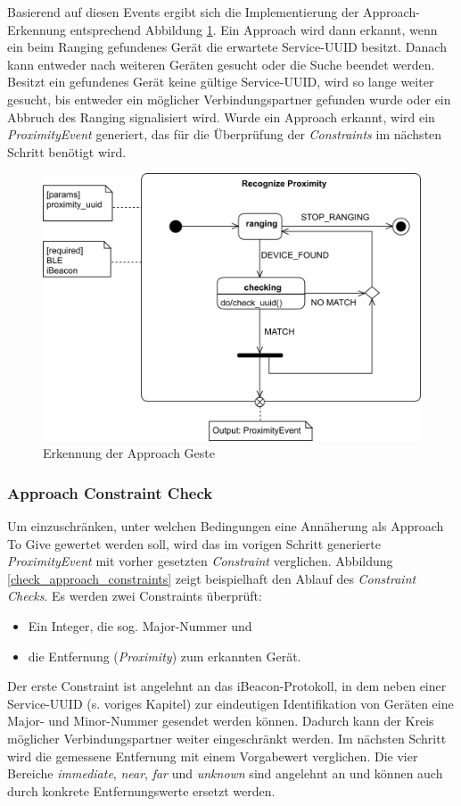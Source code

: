 {Basierend auf diesen Events ergibt sich die Implementierung der Approach-Erkennung entsprechend Abbildung \ref{recognize_approach}. Ein Approach wird dann erkannt, wenn ein beim Ranging gefundenes Gerät die erwartete Service-UUID besitzt. Danach kann entweder nach weiteren Geräten gesucht oder die Suche beendet werden. Besitzt ein gefundenes Gerät keine gültige Service-UUID, wird so lange weiter gesucht, bis entweder ein möglicher Verbindungspartner gefunden wurde oder ein Abbruch des Ranging signalisiert wird. Wurde ein Approach erkannt, wird ein \textit{ProximityEvent} generiert, das für die Überprüfung der \textit{Constraints} im nächsten Schritt benötigt wird.

\begin{figure}[h]
\includegraphics[width=\textwidth]{approach_recognize.png}
\caption{Erkennung der Approach Geste}
\label{recognize_approach}
\end{figure}

\subsubsection*{Approach Constraint Check}
Um einzuschränken, unter welchen Bedingungen eine Annäherung als Approach To Give gewertet werden soll, wird das im vorigen Schritt generierte \textit{ProximityEvent} mit vorher gesetzten \textit{Constraint} verglichen. Abbildung \ref{check_approach_constraints} zeigt beispielhaft den Ablauf des \textit{Constraint Checks}. Es werden zwei Constraints überprüft:
\begin{itemize}
\item Ein Integer, die sog. Major-Nummer und
\item die Entfernung (\textit{Proximity}) zum erkannten Gerät.
\end{itemize}
Der erste Constraint ist angelehnt an das iBeacon-Protokoll, in dem neben einer Service-UUID (s. voriges Kapitel) zur eindeutigen Identifikation von Geräten eine Major- und Minor-Nummer gesendet werden können. Dadurch kann der Kreis möglicher Verbindungspartner weiter eingeschränkt werden. 
Im nächsten Schritt wird die gemessene Entfernung mit einem Vorgabewert verglichen. Die vier Bereiche \textit{immediate}, \textit{near}, \textit{far} und \textit{unknown} sind angelehnt an \cite{Marquardt2015} und können auch durch konkrete Entfernungswerte ersetzt werden.\\

}
